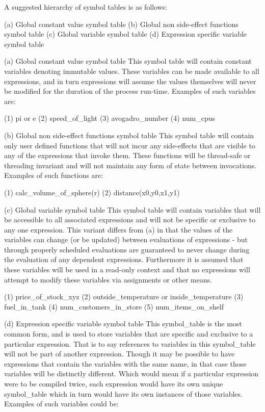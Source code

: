 A suggested hierarchy of symbol tables is as follows:

(a) Global constant value symbol table
(b) Global non side-effect functions symbol table
(c) Global variable symbol table
(d) Expression specific variable symbol table


(a) Global constant value symbol table
This symbol table will  contain constant variables denoting  immutable
values. These variables can be made available to all expressions,  and
in turn expressions  will assume the  values themselves will  never be
modified for the  duration of the  process run-time. Examples  of such
variables are:

(1) pi or e
(2) speed\_of\_light
(3) avogadro\_number
(4) num\_cpus


(b) Global non side-effect functions symbol table
This symbol table will contain  only user defined functions that  will
not incur any side-effects that are visible to any of the  expressions
that invoke  them. These  functions will  be thread-safe  or threading
invariant and will not maintain any form of state between invocations.
Examples of such functions are:

(1) calc\_volume\_of\_sphere(r)
(2) distance(x0,y0,x1,y1)


(c) Global variable symbol table
This symbol table  will contain variables  that will be  accessible to
all associated expressions  and will not  be specific or  exclusive to
any one expression. This variant  differs from (a) in that  the values
of the  variables can  change (or  be updated)  between evaluations of
expressions  -   but  through   properly  scheduled   evaluations  are
guaranteed  to never  change during  the evaluation  of any  dependent
expressions. Furthermore it  is assumed that  these variables will  be
used in a  read-only context and  that no expressions  will attempt to
modify these variables via assignments or other means.

(1) price\_of\_stock\_xyz
(2) outside\_temperature or inside\_temperature
(3) fuel\_in\_tank
(4) num\_customers\_in\_store
(5) num\_items\_on\_shelf


(d) Expression specific variable symbol table
This  symbol\_table  is  the most  common form,  and is  used to  store
variables that are specific and exclusive to a particular  expression.
That is to say references  to variables in this symbol\_table  will not
be  part of  another expression.  Though it  may be  possible to  have
expressions that  contain the  variables with  the same  name, in that
case those variables will be distinctly different. Which would mean if
a particular  expression were  to be  compiled twice,  each expression
would have its  own unique symbol\_table  which in turn  would have its
own instances of those variables. Examples of such variables could be:

